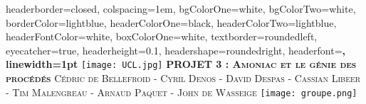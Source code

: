 \documentclass[landscape,a0paper,fontscale=0.285]{baposter} %
\begin{document}
\begin{poster}
{
headerborder=closed, %
colspacing=1em, %
bgColorOne=white, %
bgColorTwo=white, %
borderColor=lightblue, %
headerColorOne=black, %
headerColorTwo=lightblue, %
headerFontColor=white, %
boxColorOne=white, %
textborder=roundedleft, %
eyecatcher=true, %
headerheight=0.1\textheight, %
headershape=roundedright, %
headerfont=\Large\bf\textsc, %
linewidth=1pt %
}
%
{\texttt{[image: UCL.jpg]}} %
{\bf\textsc{PROJET 3 : Amoniac et le g\'enie des proc\'ed\'es}\vspace{0.5em}} %
{\textsc{\small Cédric de Bellefroid - Cyril Denos - David Despas  - Cassian Libeer  - Tim Malengreau - Arnaud Paquet - John de Wasseige}} %
{\texttt{[image: groupe.png]}} %


\end{poster}
\end{document}
